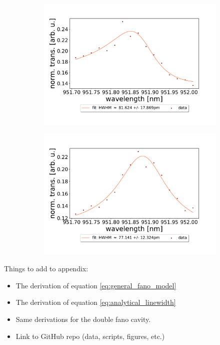 \begin{figure}[h!]
\begin{subfigure}[b]{0.49\textwidth}
        \caption{}
        \label{fig:30um_M3:M5_fit_2}
    \end{subfigure}
    \begin{subfigure}[b]{0.49\textwidth}
        \includegraphics[width=\textwidth]{figures/results/double fano fits/30um_M3:M5_fit_3.pdf}
        \caption{}
        \label{fig:30um_M3:M5_fit_3}
    \end{subfigure}
    \begin{subfigure}[b]{0.49\textwidth}
        \includegraphics[width=\textwidth]{figures/results/double fano fits/30um_M3:M5_fit_4.pdf}
        \caption{}
        \label{fig:30um_M3:M5_fit_4}
    \end{subfigure}
\end{figure}

\clearpage
Things to add to appendix:
\begin{itemize}
    \item The derivation of equation \ref{eq:general_fano_model}
    \item The derivation of equation \ref{eq:analytical_linewidth}
    \item Same derivations for the double fano cavity.
    \item Link to GitHub repo (data, scripts, figures, etc.)
\end{itemize}